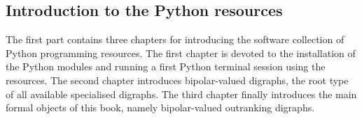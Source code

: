 % 
%
%

\begin{partbacktext}
\part{Introduction to the \Digraph Python resources}
\noindent The first part contains three chapters for introducing the \Digraph software collection of Python programming resources. The first chapter is devoted to the installation of the \Digraph Python modules and running a first Python terminal session using the  resources. The second chapter introduces bipolar-valued digraphs, the root type of all available specialised digraphs. The third chapter finally introduces the main formal objects of this book, namely bipolar-valued outranking digraphs.
\end{partbacktext}